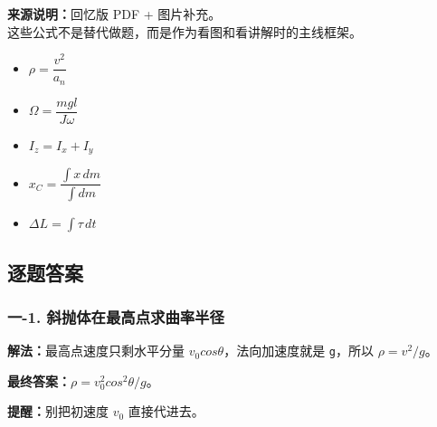 \documentclass[12pt,a4paper]{ctexart}
\begin{document}
\begin{tcolorbox}[title=本卷讲解会反复用到的公式,colback=blue!3!white,colframe=blue!45!black]
\textbf{来源说明：}回忆版 PDF + 图片补充。\\
这些公式不是替代做题，而是作为看图和看讲解时的主线框架。
\begin{itemize}
\item $\rho=\dfrac{v^2}{a_n}$
\item $\Omega=\dfrac{mgl}{J\omega}$
\item $I_z=I_x+I_y$
\item $x_C=\dfrac{\int x\,dm}{\int dm}$
\item $\Delta L=\int \tau\,dt$
\end{itemize}
\end{tcolorbox}


\subsection*{逐题答案}

\subsubsection*{一-1. 斜抛体在最高点求曲率半径}
\begin{tcolorbox}[colback=gray!2!white,colframe=black!60,title={题目}]

\end{tcolorbox}
\begin{tcolorbox}[colback=blue!2!white,colframe=blue!55!black,title={完整答案}]
\textbf{解法：}最高点速度只剩水平分量 \(v_0 cosθ\)，法向加速度就是 \texttt{g}，所以 \(ρ=v^2/g\)。\par
\textbf{最终答案：}\(ρ=v_0^2 cos^2θ/g\)。\par

\end{tcolorbox}
\begin{tcolorbox}[colback=red!2!white,colframe=red!55!black,title={易错点}]
\textbf{提醒：}别把初速度 \(v_0\) 直接代进去。\par
\end{tcolorbox}
\end{document}
